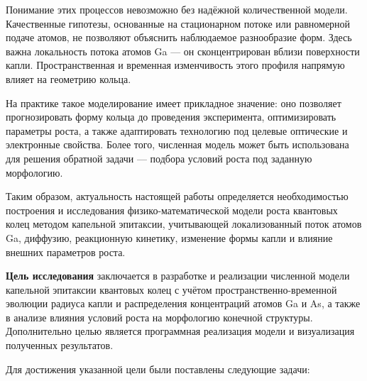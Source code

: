 \documentclass[14pt,oneside]{extarticle}
\begin{document}
Понимание этих процессов невозможно без надёжной количественной модели. Качественные гипотезы, основанные на стационарном потоке или равномерной подаче атомов, не позволяют объяснить наблюдаемое разнообразие форм. Здесь важна локальность потока атомов Ga — он сконцентрирован вблизи поверхности капли. Пространственная и временная изменчивость этого профиля напрямую влияет на геометрию кольца.

На практике такое моделирование имеет прикладное значение: оно позволяет прогнозировать форму кольца до проведения эксперимента, оптимизировать параметры роста, а также адаптировать технологию под целевые оптические и электронные свойства. Более того, численная модель может быть использована для решения обратной задачи — подбора условий роста под заданную морфологию.

Таким образом, актуальность настоящей работы определяется необходимостью построения и исследования физико-математической модели роста квантовых колец методом капельной эпитаксии, учитывающей локализованный поток атомов Ga, диффузию, реакционную кинетику, изменение формы капли и влияние внешних параметров роста.


\textbf{Цель исследования} заключается в разработке и реализации численной модели капельной эпитаксии квантовых колец с учётом пространственно-временной эволюции радиуса капли и распределения концентраций атомов Ga и As, а также в анализе влияния условий роста на морфологию конечной структуры. Дополнительно целью является программная реализация модели и визуализация полученных результатов.

Для достижения указанной цели были поставлены следующие задачи:
\end{document}
